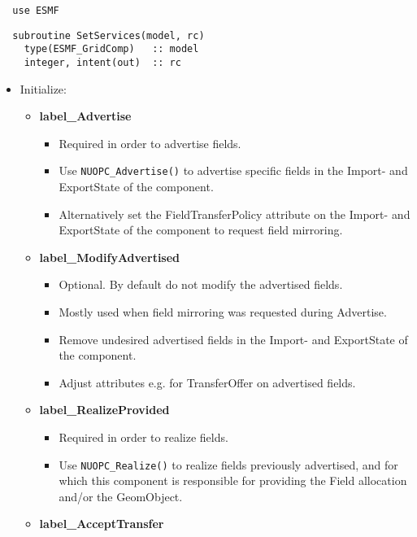 \begin{verbatim}  use ESMF
\end{verbatim}

\begin{verbatim}  subroutine SetServices(model, rc)
    type(ESMF_GridComp)   :: model
    integer, intent(out)  :: rc
\end{verbatim}

\begin{itemize}
  \item Initialize:
  \begin{itemize}
    \item {\bf label\_Advertise}
    \begin{itemize}
      \item Required in order to advertise fields.
      \item Use {\tt NUOPC\_Advertise()} to advertise specific fields in the Import- and ExportState of the component.
      \item Alternatively set the FieldTransferPolicy attribute on the Import- and ExportState of the component to request field mirroring.
    \end{itemize}
    \item {\bf label\_ModifyAdvertised}
    \begin{itemize}
      \item Optional. By default do not modify the advertised fields.
      \item Mostly used when field mirroring was requested during Advertise.
      \item Remove undesired advertised fields in the Import- and ExportState of the component.
      \item Adjust attributes e.g. for TransferOffer on advertised fields.
    \end{itemize}
    \item {\bf label\_RealizeProvided}
    \begin{itemize}
      \item Required in order to realize fields.
      \item Use {\tt NUOPC\_Realize()} to realize fields previously advertised, and for which this component is responsible for providing the Field allocation and/or the GeomObject.
    \end{itemize}
    \item {\bf label\_AcceptTransfer}
    \begin{itemize}

\end{itemize}
\end{itemize}
\end{itemize}
